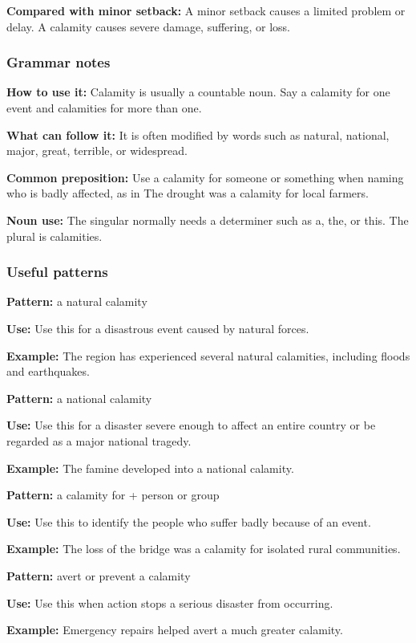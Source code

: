 \documentclass[11pt]{article}
\begin{document}
\textbf{Compared with minor setback:} A minor setback causes a limited problem or delay. A calamity causes severe damage, suffering, or loss.

\subsubsection{Grammar notes}
\textbf{How to use it:} Calamity is usually a countable noun. Say a calamity for one event and calamities for more than one.

\textbf{What can follow it:} It is often modified by words such as natural, national, major, great, terrible, or widespread.

\textbf{Common preposition:} Use a calamity for someone or something when naming who is badly affected, as in The drought was a calamity for local farmers.

\textbf{Noun use:} The singular normally needs a determiner such as a, the, or this. The plural is calamities.

\subsubsection{Useful patterns}
\textbf{Pattern:} a natural calamity

\textbf{Use:} Use this for a disastrous event caused by natural forces.

\textbf{Example:} The region has experienced several natural calamities, including floods and earthquakes.

\textbf{Pattern:} a national calamity

\textbf{Use:} Use this for a disaster severe enough to affect an entire country or be regarded as a major national tragedy.

\textbf{Example:} The famine developed into a national calamity.

\textbf{Pattern:} a calamity for + person or group

\textbf{Use:} Use this to identify the people who suffer badly because of an event.

\textbf{Example:} The loss of the bridge was a calamity for isolated rural communities.

\textbf{Pattern:} avert or prevent a calamity

\textbf{Use:} Use this when action stops a serious disaster from occurring.

\textbf{Example:} Emergency repairs helped avert a much greater calamity.
\end{document}
